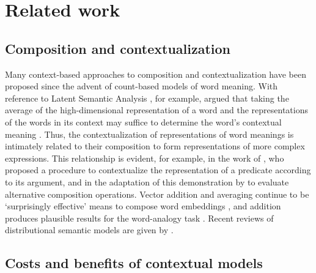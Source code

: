 \section{Related work}
\label{sec:related-work}

\subsection{Composition and contextualization}

Many context-based approaches to composition and contextualization have been proposed
since the advent of count-based models of word meaning.
With reference to Latent Semantic Analysis \parencite{Deerwester1990}, for example,
\citeauthor{Landauer1997} argued that taking the average of the high-dimensional
representation of a word and the representations of the words in its context may
suffice to determine the word's contextual meaning \parencite*[229-230]{Landauer1997}.
Thus, the contextualization of representations of word meanings is intimately related
to their composition to form representations of more complex expressions.
This relationship is evident, for example, in the work of \textcite{Kintsch2001}, who
proposed a procedure to contextualize the representation of a predicate according to
its argument, and in the adaptation of this demonstration by \textcite{Mitchell2008} to
evaluate alternative composition operations.
Vector addition and averaging continue to be `surprisingly effective' means to compose
word embeddings \parencite[10]{Boleda2020}, and addition produces plausible results for
the word-analogy task \parencites[9]{Mikolov2013}[7]{Mikolov2013a}.
Recent reviews of distributional semantic models are given by
\textcites{Lenci2018}{Boleda2020}.

\subsection{Costs and benefits of contextual models}

